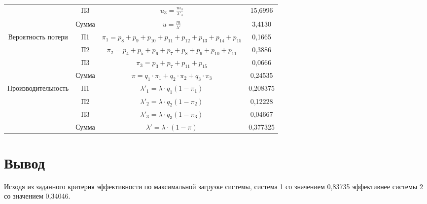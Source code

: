 \begin{adjustbox}{max width=\textwidth}
\begin{tabular}{|c|c|c|c|}
                                    & П3     & $u_3 = \frac{m_3}{\lambda'_3}$                                                                           & 15,6996  \\ \cline{2-4}
                                    & Сумма  & $u = \frac{m}{\lambda'}$                                                                                 & 3,4130   \\ \hline
\multirow{4}{*}{Вероятность потери} & П1     & $\pi_1 = p_8+p_9+p_{10}+p_{11}+p_{12}+p_{13}+p_{14}+p_{15}$                                                          & 0,1665   \\ \cline{2-4}
                                    & П2     & $\pi_2 = p_4+p_5+p_6+p_7+p_8+p_9+p_{10}+p_{11}$                                                              & 0,3886   \\ \cline{2-4}
                                    & П3     & $\pi_3 = p_3 + p_7 + p_{11} + p_{15}$                                                                        & 0,0666   \\ \cline{2-4}
                                    & Сумма  & $\pi = q_1 \cdot \pi_1 + q_2 \cdot \pi_2 + q_3 \cdot \pi_3$                                              & 0,24535  \\ \hline
\multirow{4}{*}{Производительность} & П1     & $\lambda'_1 = \lambda \cdot q_1(1 - \pi_1)$                                                              & 0,208375 \\ \cline{2-4}
                                    & П2     & $\lambda'_2 = \lambda \cdot q_2(1 - \pi_2)$                                                              & 0,12228  \\ \cline{2-4}
                                    & П3     & $\lambda'_3 = \lambda \cdot q_3(1 - \pi_3)$                                                              & 0,04667  \\ \cline{2-4}
                                    & Сумма  & $\lambda' = \lambda \cdot (1 - \pi)$                                                                     & 0,377325 \\ \hline
\end{tabular}
\end{adjustbox}

\section{Вывод}
Исходя из заданного критерия эффективности по максимальной загрузке системы,
система 1 со значением 0,83735 эффективнее системы 2 со значением 0,34046.

